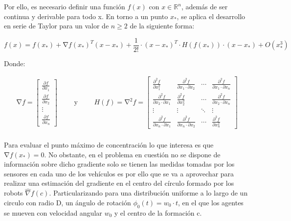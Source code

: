 Por ello, es necesario definir una función $f\left(x\right)$ con $x\in\mathbb{R}^{n}$, además de ser continua y derivable para todo x. En torno a un punto $x_*$, se aplica el desarrollo en serie de Taylor para un valor de $n\geq{2}$ de la siguiente forma:

\begin{equation}\label{TaylorNormal}
	f\left(x\right)=f\left(x_{*}\right)+\mathrm{\nabla}{f}{\left(x_{*}\right)}^{T}\left(x-x_{*}\right)+\frac{1}{2!}\cdot{\left(x-x_{*}\right)}^{T}\cdot{H}\left({f}\left(x_{*}\right)\right) 		\cdot\left(x-x_{*}\right)+O\left(x_{*}^3\right)
\end{equation}

Donde:

\begin{equation*}
	\begin{aligned}
		\mathrm{\nabla}{f}=
	\begin{bmatrix}
		\frac{\partial{f}}{\partial{x}_1} \\
		\frac{\partial{f}}{\partial{x}_2}  \\
		\vdots \\
		\frac{\partial{f}}{\partial{x}_n}
	\end{bmatrix}
	\end{aligned}
	\qquad\text{y}\qquad
	\begin{aligned}
	{H}\left(f\right)=\mathrm{\nabla}^{2}{f}= 	
	\begin{bmatrix}
		\frac{\partial^{2}{f}}{\partial{x}_{1}^{2}} & \frac{\partial^{2}{f}}{\partial{x}_{1}\cdot\partial{x}_{2}} & \cdots & \frac{\partial^{2}{f}}{\partial{x}_{1}\cdot\partial{x}_{n}}\\
		\frac{\partial^{2}{f}}{\partial{x}_{2}\cdot\partial{x}_{1}} & \frac{\partial^{2}{f}}{\partial{x}_{2}^{2}} & \cdots & \frac{\partial^{2}{f}}{\partial{x}_{2}\cdot\partial{x}_{n}}\\
		\vdots & \vdots & \ddots & \vdots\\
		\frac{\partial^{2}{f}}{\partial{x}_{n}\cdot\partial{x}_{1}} & \frac{\partial^{2}{f}}{\partial{x}_{n}\cdot\partial{x}_{2}} & \cdots & \frac{\partial^{2}{f}}{\partial{x}_{n}^{2}}
	\end{bmatrix}
	\end{aligned}
\end{equation*}\\

Para evaluar el punto máximo de concentración lo que interesa es que $\mathrm{\nabla}{f}{\left(x_{*}\right)}=0$. No obstante, en el problema en cuestión no se dispone de información sobre dicho gradiente solo se tienen las medidas tomadas por los sensores en cada uno de los vehículos es por ello que se va a aprovechar para realizar una estimación del gradiente en el centro del círculo formado por los robots $\hat{\nabla}{f}\left(c\right)$.
\newpage
Particularizando para una distribución uniforme a lo largo de un circulo con radio D, un ángulo de rotación $\phi_0\left(t\right)=w_0\cdot{t}$, en el que los agentes se mueven con velocidad angular $w_0$ y el centro de la formación c. 

